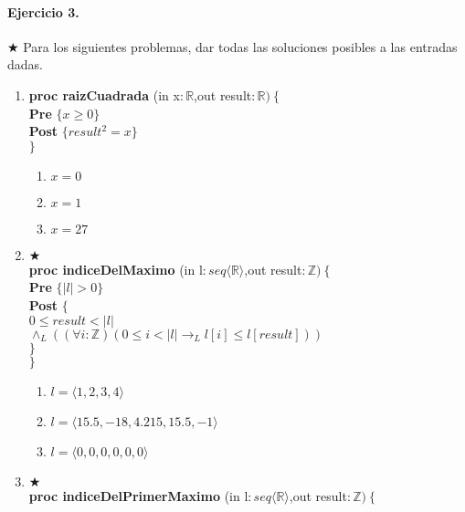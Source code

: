 \documentclass[a4paper]{article}
\begin{document}
\paragraph*{Ejercicio 3.}$\bigstar$ Para los siguientes problemas, dar todas las soluciones posibles a las entradas dadas.
	\begin{enumerate}[label=\alph*)]
		\item 
			\textbf{proc raizCuadrada }(in x$: \mathbb{R}$,out result$:\mathbb{R})\ \{$\smallskip \\
			\hspace*{6mm} \textbf{Pre }$\{ x\geq 0\}$\smallskip \\
			\hspace*{6mm} \textbf{Post }$\{result^2=x\}$\\
			$\}$
			\begin{enumerate}[label=\Roman*)]
				\item $x=0$
				\item $x=1$
				\item $x=27$
			\end{enumerate}
		\item $\bigstar$ \\
			\textbf{proc indiceDelMaximo }(in l$: seq\langle\mathbb{R}\rangle$,out result$:\mathbb{Z})\ \{$\smallskip \\
			\hspace*{6mm} \textbf{Pre }$\{ |l| > 0\}$\smallskip \\
			\hspace*{6mm} \textbf{Post }$\{$\\
			\hspace*{6mm} $0\leq result < |l|$\\
			\hspace*{6mm} $\wedge_L((\forall i :\mathbb{Z})(0 \leq i < |l|\rightarrow_L l[i]\leq l[result]))$\\
			\hspace*{6mm}$\}$\\
			$\}$
			\begin{enumerate}[label=\Roman*)]
				\item $l=\langle 1,2,3,4\rangle$
				\item $l=\langle 15.5,-18,4.215,15.5,-1\rangle$
				\item $l=\langle 0,0,0,0,0,0\rangle$
			\end{enumerate}
		\item
			$\bigstar$ \\
			\textbf{proc indiceDelPrimerMaximo }(in l$: seq\langle\mathbb{R}\rangle$,out result$:\mathbb{Z})\ \{$\smallskip \\

\end{enumerate}
\end{document}
